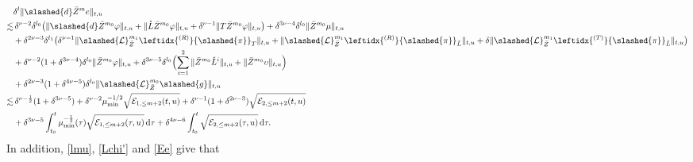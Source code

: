 \documentclass[11pt,twoside]{article}
\def\vp{\varphi}
\def\f{\frac}
\begin{document}
\begin{align}
&\delta^l\|\slashed{d}\bar{Z}^m e\|_{t,u}\nonumber \\
\lesssim &\, \delta^{\nu-2}\delta^{l_0}\bigl(\|\slashed{d}\bar{Z}^{m_0}\vp\|_{t,u}
+\|\mathring{L}\bar{Z}^{m_0}\vp\|_{t,u}
+\delta^{\nu-1}\|T\bar{Z}^{m_0}\vp\|_{t,u}\bigr)
+\delta^{3\nu-4}\delta^{l_0}\|\bar{Z}^{m_0}\mu\|_{t,u} \nonumber\\
&+\delta^{2\nu-3}\delta^{l_1}\bigl(\delta^{\nu-1}\|\slashed{\mathcal{L}}_{\bar{Z}}^{m_1}\leftidx{^{(R)}}{\slashed{\pi}}_T\|_{t,u}
+\|\slashed{\mathcal{L}}_{\bar{Z}}^{m_1}\leftidx{^{(R)}}{\slashed{\pi}}_{\mathring{L}}\|_{t,u}
+\delta\|\slashed{\mathcal{L}}_{\bar{Z}}^{m_1}\leftidx{^{(T)}}{\slashed{\pi}}_{\mathring{L}}\|_{t,u}\bigr) \nonumber\\
&+\delta^{\nu-2}(1+\delta^{3\nu-4})\delta^{l_0}\|\bar{Z}^{m_0}\vp\|_{t,u}
+\delta^{3\nu-5}\delta^{l_0}\Bigl(\sum_{i=1}^2\|\bar{Z}^{m_0}\check{L}^i\|_{t,u}
+\|\bar{Z}^{m_0}\upsilon\|_{t,u}\Bigr)\nonumber \\
&+\delta^{2\nu-3}(1+\delta^{4\nu-5})\delta^{l_0}\|\slashed{\mathcal{L}}_{\bar{Z}}^{m_0}\slashed{g}\|_{t,u}\nonumber \\
\lesssim &\, \delta^{\nu-\f12}(1+\delta^{3\nu-5})
+\delta^{\nu-2}\mu_{\min}^{-1/2}\sqrt{\mathcal{E}_{1,\leq m+2}(t,u)}
+\delta^{\nu-1}(1+\delta^{2\nu-3})\sqrt{\mathcal{E}_{2,\leq m+2}(t,u)}  \label{de}\\
&+\delta^{3\nu-5}\int_{t_0}^t\mu_{\min}^{-\f12}(\tau)\sqrt{\mathcal{E}_{1,\leq m+2}(\tau,u)}\,\mathrm{d}\tau
+\delta^{4\nu-6}\int_{t_0}^t\sqrt{\mathcal{E}_{2,\leq m+2}(\tau,u)}\,\mathrm{d}\tau.\nonumber
\end{align}
In addition, \eqref{lmu}, \eqref{Lchi'} and \eqref{Ee} give that
\end{document}
